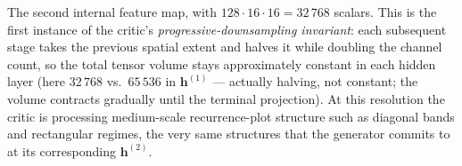
The second internal feature map, with $128 \cdot 16 \cdot 16 =
32\,768$ scalars. This is the first instance of the critic's
\emph{progressive-downsampling invariant}: each subsequent stage takes
the previous spatial extent and halves it while doubling the channel
count, so the total tensor volume stays approximately constant in each
hidden layer (here $32\,768$ vs.\ $65\,536$ in $\mathbf{h}^{(1)}$ ---
actually halving, not constant; the volume contracts gradually until
the terminal projection). At this resolution the critic is processing
medium-scale recurrence-plot structure such as diagonal bands and
rectangular regimes, the very same structures that the generator commits
to at its corresponding $\mathbf{h}^{(2)}$.
